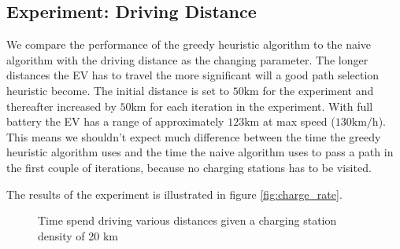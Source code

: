 \subsection{Experiment: Driving Distance}


We compare the performance of the greedy heuristic algorithm to the naive algorithm with the driving distance as the changing parameter. The longer distances the EV has to travel the more significant will a good path selection heuristic become. The initial distance is set to $50 \si{\km}$ for the experiment and thereafter increased by $50 \si{\km}$ for each iteration in the experiment. With full battery the EV has a range of approximately $123 \si{\km}$ at max speed ($130 \si{\km\per\hour}$). This means we shouldn't expect much difference between the time the greedy heuristic algorithm uses and the time the naive algorithm uses to pass a path in the first couple of iterations, because no charging stations has to be visited.

The results of the experiment is illustrated in figure \ref{fig:charge_rate}.  

\begin{figure}
\centering
{}
\caption{Time spend driving various distances given a charging station density of 20 km} 
\label{fig:driving_dist}
\end{figure}